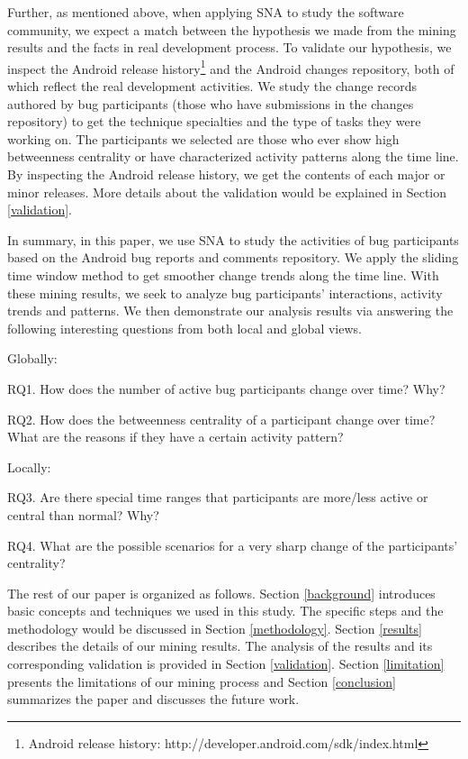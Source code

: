 \documentclass[10pt, conference, compsocconf]{IEEEtran}
\begin{document}
Further, as mentioned above, when applying SNA to study the software
community, we expect a match between the hypothesis we made from the
mining results and the facts in real development process. 
To validate our hypothesis, we inspect the Android release
history\footnote[1]{Android release history:
  http://developer.android.com/sdk/index.html} and the Android changes
repository, both of which reflect the real development activities.
 We study the change records authored by bug participants (those who
 have submissions in the changes repository) to get the technique
 specialties and the type of tasks they were working on. 
The participants we selected are those who ever show high betweenness
centrality or have characterized activity patterns along the time
line. 
By inspecting the Android release history, we get the contents of each
major or minor releases. 
More details about the validation would be explained in Section
\ref{validation}.
 

In summary, in this paper, we use SNA to study the activities of bug
participants based on the Android bug reports and comments
repository. 
We apply the sliding time window method to get smoother change trends
along the time line. 
With these mining results, we seek to analyze bug participants'
interactions, activity trends and patterns. 
We then demonstrate our analysis results via answering the following
interesting questions from both local and global views.


Globally:

RQ1. How does the number of active bug participants change over time? Why?

RQ2. How does the betweenness centrality of a participant change over
time? What are the reasons if they have a certain activity pattern?


Locally:

RQ3. Are there special time ranges that participants are more/less
active or central than normal? Why?


RQ4. What are the possible scenarios for a very sharp change of the
participants' centrality?


The rest of our paper is organized as follows. 
Section \ref{background} introduces basic concepts and techniques we
used in this study. 
The specific steps and the methodology would be discussed in Section
\ref{methodology}. 
Section \ref{results} describes the details of our mining results. 
The analysis of the results and its corresponding validation is
provided in Section \ref{validation}. 
Section \ref{limitation} presents the limitations of our mining
process and Section \ref{conclusion} summarizes the paper and
discusses the future work.
\end{document}
